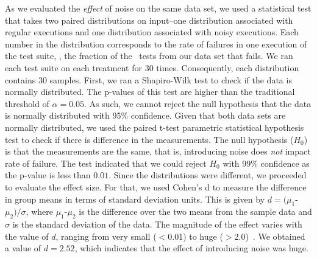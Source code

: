 \documentclass[conference]{IEEEtran}
\begin{document}

As we evaluated the \emph{effect} of noise on the same data set, we used a statistical test that takes two paired distributions on input--one distribution associated with regular executions and one distribution associated with noisy executions. Each number in the distribution corresponds to the rate of failures in one execution of the test suite, \ie{}, the fraction of the \numflakytestsds\ tests from our data set that fails. We ran each test suite on each treatment for 30 times. Consequently, each distribution contains 30 samples. 
First, we ran a Shapiro-Wilk test to check if the data is normally distributed. The p-values of this test are higher than the traditional threshold of $\alpha=0.05$. As such, we cannot reject the null hypothesis that the data is normally distributed with 95\% confidence. 
Given that both data sets are normally distributed, we used the paired t-test parametric statistical hypothesis test to check if there is difference in the measurements. 
The null hypothesis ($H_0$) is that the measurements are the same, that is, introducing noise does \emph{not} impact rate of failure. The test indicated that we could reject $H_0$ with 99\% confidence as the p-value is less than $0.01$. 
Since the distributions were different, we proceeded to evaluate the effect size. For that, we used Cohen's d to measure the difference in group means in terms of standard deviation units. 
This is given by $d=(\mu_1$-$\mu_2)/\sigma$, where $\mu_1$-$\mu_2$ is the difference over the two means from the sample data and $\sigma$ is the standard deviation of the data. 
The magnitude of the effect varies with the value of $d$, ranging from very small ($<$0.01) to huge ($>$2.0)~\cite{effect-sizes-cohen}. 
We obtained a value of $d=2.52$, which indicates that the effect of introducing noise was huge. 
\end{document}
